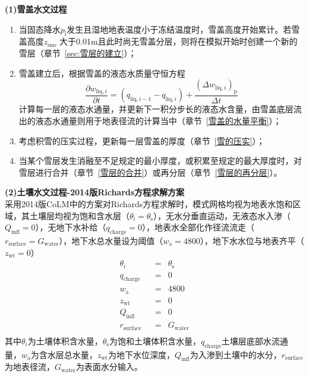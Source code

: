 \textbf {(1)雪盖水文过程}\\

\begin{enumerate}
  \item 当固态降水$p_{\mathrm {i}} $发生且湿地地表温度小于冻结温度时，雪盖高度开始累计。若雪盖高度$z_{\mathrm{sno}}$ 大于0.01m且此时尚无雪盖分层，则将在模拟开始时创建一个新的雪层（章节~\ref{sec:雪层的建立}）；
  \item 雪盖建立后，根据雪盖的液态水质量守恒方程
    \begin{equation}
      \frac{\partial w_{\mathrm{liq},i}}{\partial t}=\left(q_{\mathrm{liq},i-1}-q_{\mathrm{liq},i}\right)+\frac{{\left(\Delta w_{\mathrm{liq},i}\right)}_{\mathrm {p}} }{\Delta t}
    \end{equation}
    计算每一层的液态水通量，并更新下一积分步长的液态水含量，由雪盖底层流出的液态水通量则用于地表径流的计算当中（章节~\ref{雪盖的水量平衡}）；
  \item 考虑积雪的压实过程，更新每一层雪盖的厚度（章节~\ref{雪的压实}）；
  \item 当某个雪层发生消融至不足规定的最小厚度，或积累至规定的最大厚度时，对雪层进行合并（章节~\ref{雪层的合并}）或再分层（章节~\ref{雪层的再分层}）。
\end{enumerate}

\textbf {(2)土壤水文过程-2014版Richards方程求解方案}\\

采用2014版CoLM中的方案对Richards方程求解时，模式网格均视为地表水饱和区域，其土壤层均视为饱和含水层（$\theta_{\mathrm{i}}=\theta_{\mathrm{s}}$），无水分垂直运动，无液态水入渗（$Q_{\mathrm{infl}}=0$），无地下水补给（$q_{\mathrm{charge}}=0$），地表水全部化作径流流走（$r_{\mathrm{surface}}=G_{\mathrm{water}}$），地下水总水量设为阈值（$w_{\mathrm {a}} =4800$），地下水水位与地表齐平（$z_{\mathrm{wt}}=0$）
\begin{equation}
  \begin{aligned}
    &\theta_{i} &&= &\theta_{\mathrm{s}}& \\
    &q_{\mathrm{charge}} &&=&0 &\\
    &w_{\mathrm {a}}  &&=&4800& \\
    &z_{\mathrm{wt}} &&=&0& \\
    &Q_{\mathrm{infl}} &&=&0& \\
    &r_{\mathrm{surface}} &&=&G_{\mathrm{water}}& \\
  \end{aligned}
\end{equation}
其中$\theta_{i}$为土壤体积含水量，$\theta_{\mathrm{s}}$为饱和土壤体积含水量，$q_{\mathrm{charge}}$土壤层底部水流通量，$w_{\mathrm{a}}$为含水层总水量，$z_{\mathrm{wt}}$为地下水位深度，$Q_{\mathrm{infl}}$为入渗到土壤中的水分，$r_{\mathrm{surface}}$为地表径流，$G_{\mathrm{water}}$为表面水分输入。\\

